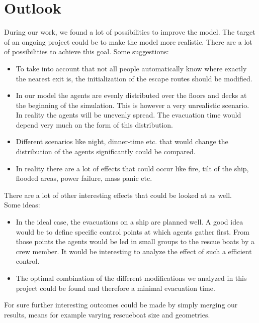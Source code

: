 \documentclass[11pt]{article}
\begin{document}
\section{Outlook}
During our work, we found a lot of possibilities to improve the model. The target of an ongoing project could be to make the model more realistic. There are a lot of possibilities to achieve this goal.
\newline
Some suggestions:
\begin{itemize}
\item To take into account that not all people automatically know where exactly the nearest exit is, the initialization of the escape routes should be modified.
\item In our model the agents are evenly distributed over the floors and decks at the beginning of the simulation. This is however a very unrealistic scenario. In reality the agents will be unevenly spread. The evacuation time would depend very much on the form of this distribution.
\item Different scenarios like night, dinner-time etc. that would change the distribution of the agents significantly could be compared.
\item In reality there are a lot of effects that could occur like fire, tilt of the ship, flooded areas, power failure, mass panic etc.
\end{itemize}
There are a lot of other interesting effects that could be looked at as well.
\\
Some ideas:
\begin{itemize}
\item In the ideal case, the evacuations on a ship are planned well. A good idea would be to define specific control points at which agents gather first. From those points the agents would be led in small groups to the rescue boats by a crew member. It would be interesting to analyze the effect of such a efficient control.
\item The optimal combination of the different modifications we analyzed in this project could be found and therefore a minimal evacuation time.
\end{itemize}
For sure further interesting outcomes could be made by simply merging our results, means for example varying rescueboat size and geometries.

\newpage
\end{document}
